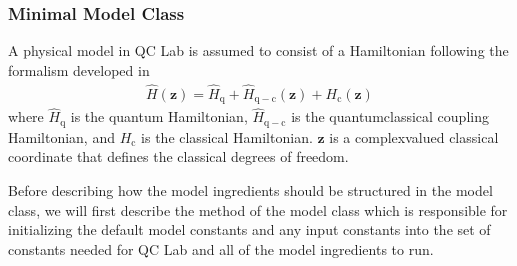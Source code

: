 \documentclass[letterpaper,10pt,english]{sphinxmanual}
\begin{document}
\subsubsection{Minimal Model Class}
\label{\detokenize{user_guide/model_dev:minimal-model-class}}
\sphinxAtStartPar
A physical model in QC Lab is assumed to consist of a Hamiltonian following the formalism developed in 
\begin{equation*}
\begin{split}\hat{H}(\boldsymbol{z}) = \hat{H}_{\mathrm{q}} + \hat{H}_{\mathrm{q-c}}(\boldsymbol{z}) + H_{\mathrm{c}}(\boldsymbol{z})\end{split}
\end{equation*}
\sphinxAtStartPar
where \(\hat{H}_{\mathrm{q}}\) is the quantum Hamiltonian, \(\hat{H}_{\mathrm{q-c}}\) is the quantum\sphinxhyphen{}classical coupling Hamiltonian,
and \(H_{\mathrm{c}}\) is the classical Hamiltonian. \(\boldsymbol{z}\) is a complex\sphinxhyphen{}valued classical coordinate that defines the
classical degrees of freedom.

\sphinxAtStartPar
Before describing how the model ingredients should be structured in the model class, we will first describe the  method of the model class
which is responsible for initializing the default model constants and any input constants into the set of constants needed for QC Lab and all
of the model ingredients to run.
\end{document}
